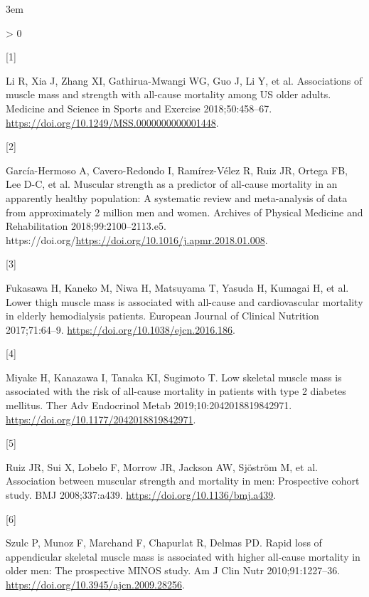 \documentclass[twoside,10pt]{gihclass} %
\newlength{\cslhangindent}
\newlength{\csllabelwidth}
\newenvironment{CSLReferences}[3] %
 {%
  \setlength{\parindent}{0pt}
  \ifodd #1 \everypar{\setlength{\hangindent}{\cslhangindent}}\ignorespaces\fi
  \ifnum #2 > 0
  \setlength{\parskip}{#2\baselineskip}
  \fi
 }%
 {}
\newcommand{\CSLLeftMargin}[1]{\parbox[t]{\maxof{\widthof{#1}}{\csllabelwidth}}{#1}}
\newcommand{\CSLRightInline}[1]{\parbox[t]{\linewidth}{#1}}
\begin{document}
\setlength{\parskip}{4pt}

\rightskip3em

\footnotesize

\hypertarget{refs}{}
\begin{CSLReferences}{0}{0}
\leavevmode\hypertarget{ref-RN2512}{}%
\CSLLeftMargin{{[}1{]} }
\CSLRightInline{Li R, Xia J, Zhang XI, Gathirua-Mwangi WG, Guo J, Li Y, et al. Associations of muscle mass and strength with all-cause mortality among US older adults. Medicine and Science in Sports and Exercise 2018;50:458--67. \url{https://doi.org/10.1249/MSS.0000000000001448}.}

\leavevmode\hypertarget{ref-RN2808}{}%
\CSLLeftMargin{{[}2{]} }
\CSLRightInline{García-Hermoso A, Cavero-Redondo I, Ramírez-Vélez R, Ruiz JR, Ortega FB, Lee D-C, et al. Muscular strength as a predictor of all-cause mortality in an apparently healthy population: A systematic review and meta-analysis of data from approximately 2 million men and women. Archives of Physical Medicine and Rehabilitation 2018;99:2100--2113.e5. https://doi.org/\url{https://doi.org/10.1016/j.apmr.2018.01.008}.}

\leavevmode\hypertarget{ref-RN2513}{}%
\CSLLeftMargin{{[}3{]} }
\CSLRightInline{Fukasawa H, Kaneko M, Niwa H, Matsuyama T, Yasuda H, Kumagai H, et al. Lower thigh muscle mass is associated with all-cause and cardiovascular mortality in elderly hemodialysis patients. European Journal of Clinical Nutrition 2017;71:64--9. \url{https://doi.org/10.1038/ejcn.2016.186}.}

\leavevmode\hypertarget{ref-RN2514}{}%
\CSLLeftMargin{{[}4{]} }
\CSLRightInline{Miyake H, Kanazawa I, Tanaka KI, Sugimoto T. Low skeletal muscle mass is associated with the risk of all-cause mortality in patients with type 2 diabetes mellitus. Ther Adv Endocrinol Metab 2019;10:2042018819842971. \url{https://doi.org/10.1177/2042018819842971}.}

\leavevmode\hypertarget{ref-RN2809}{}%
\CSLLeftMargin{{[}5{]} }
\CSLRightInline{Ruiz JR, Sui X, Lobelo F, Morrow JR, Jackson AW, Sjöström M, et al. Association between muscular strength and mortality in men: Prospective cohort study. BMJ 2008;337:a439. \url{https://doi.org/10.1136/bmj.a439}.}

\leavevmode\hypertarget{ref-RN2515}{}%
\CSLLeftMargin{{[}6{]} }
\CSLRightInline{Szulc P, Munoz F, Marchand F, Chapurlat R, Delmas PD. Rapid loss of appendicular skeletal muscle mass is associated with higher all-cause mortality in older men: The prospective MINOS study. Am J Clin Nutr 2010;91:1227--36. \url{https://doi.org/10.3945/ajcn.2009.28256}.}


\end{CSLReferences}
\end{document}
